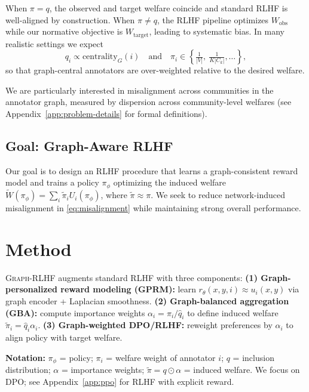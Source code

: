 \documentclass{article}
\theoremstyle{plain}
\theoremstyle{definition}
\theoremstyle{remark}
\begin{document}
When $\pi = q$, the observed and target welfare coincide and standard RLHF is
well-aligned by construction. When $\pi \neq q$, the RLHF pipeline optimizes
$W_{\text{obs}}$ while our normative objective is $W_{\text{target}}$, leading
to systematic bias. In many realistic settings we expect
\begin{equation}
    q_i \propto \text{centrality}_G(i)
    \quad\text{and}\quad
    \pi_i \in \left\{ \tfrac{1}{|V|},\ \tfrac{1}{K|C_k|}, \ldots \right\},
\end{equation}
so that graph-central annotators are over-weighted relative to the desired
welfare.

We are particularly interested in misalignment across communities in the annotator graph, measured by dispersion across community-level welfares (see Appendix~\ref{app:problem-details} for formal definitions).

\subsection{Goal: Graph-Aware RLHF}
\label{subsec:goal}

Our goal is to design an RLHF procedure that learns a graph-consistent reward model and trains a policy $\pi_\phi$ optimizing the induced welfare $\widetilde{W}(\pi_\phi) = \sum_i \tilde\pi_i U_i(\pi_\phi)$, where $\tilde\pi \approx \pi$. We seek to reduce network-induced misalignment in \eqref{eq:misalignment} while maintaining strong overall performance.



\section{Method}
\label{sec:method}

\textsc{Graph-RLHF} augments standard RLHF with three components:
\textbf{(1) Graph-personalized reward modeling (GPRM):} learn $r_\theta(x,y,i) \approx u_i(x,y)$ via graph encoder + Laplacian smoothness.
\textbf{(2) Graph-balanced aggregation (GBA):} compute importance weights $\alpha_i = \pi_i / \hat q_i$ to define induced welfare $\tilde\pi_i = \hat q_i \alpha_i$.
\textbf{(3) Graph-weighted DPO/RLHF:} reweight preferences by $\alpha_i$ to align policy with target welfare.

\textbf{Notation:} $\pi_\phi$ = policy; $\pi_i$ = welfare weight of annotator $i$; $q$ = inclusion distribution; $\alpha$ = importance weights; $\tilde\pi = q \odot \alpha$ = induced welfare.
We focus on DPO; see Appendix~\ref{app:ppo} for RLHF with explicit reward.
\end{document}
